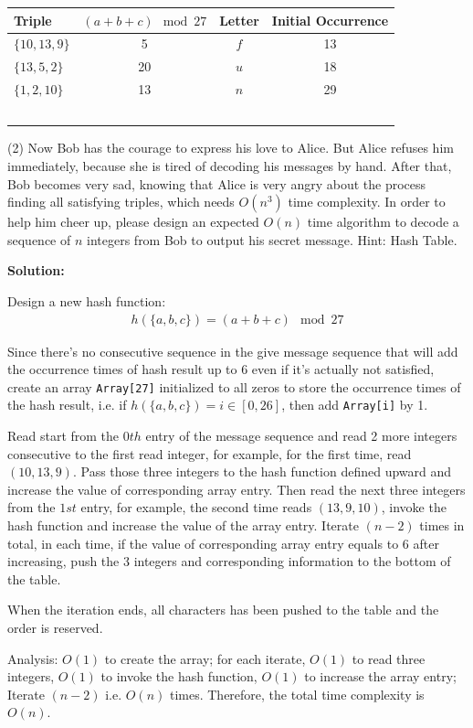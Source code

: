 \documentclass{article}
\begin{document}
\begin{table}[hp]
	\centering
	\begin{tabular}{|p{3cm}<{\centering}|c|c|c|}
		\hline
		\textbf{Triple} & \textbf{$(a+b+c)\mod 27$} & \textbf{Letter} & \textbf{Initial Occurrence} \\ \hline
		 $\{10,13,9\}$&5  &$f$  &13  \\ \hline
		 $\{13,5,2\}$&20  &$u$  &18  \\ \hline
		 $\{1,2,10\}$&13  &$n$  &29  \\ \hline
		 &  &  &  \\ \hline
		 &  &  &  \\ \hline
		 &  &  &  \\ \hline
		 &  &  &  \\ \hline
		 &  &  &  \\ \hline
	\end{tabular}
\end{table}
\pagebreak
(2) Now Bob has the courage to express his love to Alice. But Alice refuses him immediately, because she is tired of decoding his messages by hand. After that, Bob becomes very sad, knowing that Alice is very angry about the process finding all satisfying triples, which needs $O(n^3)$ time complexity. In order to help him cheer up, please design an expected $O(n)$ time algorithm to decode a sequence of $n$ integers from Bob to output his secret message. Hint: Hash Table.
\par\textbf{Solution:}
\par Design a new hash function:
\begin{align*}
h(\{a,b,c\}) = (a + b + c) \mod 27
\end{align*}
\par Since there's no consecutive sequence in the give message sequence that will add the occurrence times of hash result up to 6 even if it's actually not satisfied, create an array \texttt{Array[27]} initialized to all zeros to store the occurrence times of the hash result, i.e. if $h(\{a,b,c\}) = i \in [0,26]$, then add \texttt{Array[i]} by 1.
\par Read start from the $0th$ entry of the message sequence and read 2 more integers consecutive to the first read integer, for example, for the first time, read $(10,13,9)$. Pass those three integers to the hash function defined upward and increase the value of corresponding array entry. Then read the next three integers from the $1st$ entry, for example, the second time reads $(13,9,10)$, invoke the hash function and increase the value of the array entry. Iterate $(n - 2)$ times in total, in each time, if the value of corresponding array entry equals to 6 after increasing, push the 3 integers and corresponding information to the bottom of the table.
\par When the iteration ends, all characters has been pushed to the table and the order is reserved.
\par Analysis: $O(1)$ to create the array; for each iterate, $O(1)$ to read three integers, $O(1)$ to invoke the hash function, $O(1)$ to increase the array entry; Iterate $(n - 2)$ i.e. $O(n)$ times. Therefore, the total time complexity is $O(n)$.  
 
\end{document}
